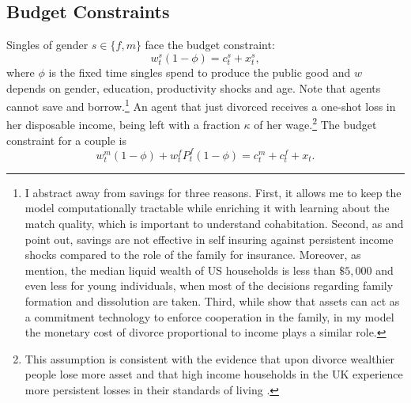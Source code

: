 \documentclass[12pt]{article}
\begin{document}
 \subsection{Budget Constraints}
Singles of gender $s\in\{f,m\}$ face the budget constraint:
\begin{equation}\label{eq:bcs}
w^s_t(1-\phi)=c^s_t+x^s_t,
\end{equation}
where $\phi$ is the fixed time singles spend to produce the public good and $w$ depends on gender, education, productivity shocks and age. Note that agents cannot save and borrow.\footnote{I abstract away from savings for three reasons. First, it allows me to keep the model computationally tractable while enriching it with learning about the match quality, which is important to understand cohabitation. Second, as \cite{wu2019} and \cite{blundell2016} point out, savings are not effective in self insuring against persistent income shocks compared to the role of the family for insurance. Moreover, as \cite{guvenen2015} mention, the median liquid wealth of US households is less than $\$5,000$ and even less for young individuals, when most of the decisions regarding family formation and dissolution are taken. Third, while \cite{lafortune2020} show that assets can act as a commitment technology to enforce cooperation in the family, in my model the monetary cost of divorce proportional to income plays a similar role.} An agent that just divorced receives a one-shot loss in her disposable income, being left with a fraction $\kappa$ of her wage.\footnote{This assumption is consistent with the evidence that upon divorce wealthier people lose more asset \citep{blasutto2020} and that high income households in the UK experience more persistent losses in their standards of living \citep{fisher2016}.} 
The budget constraint for a couple is
\begin{equation}\label{eq:bcm}
w^{m}_t(1-\phi)+w^{f}_tP^f_t(1-\phi)=c^{m}_t+c^{f}_t+x_t.
\end{equation}
\end{document}
